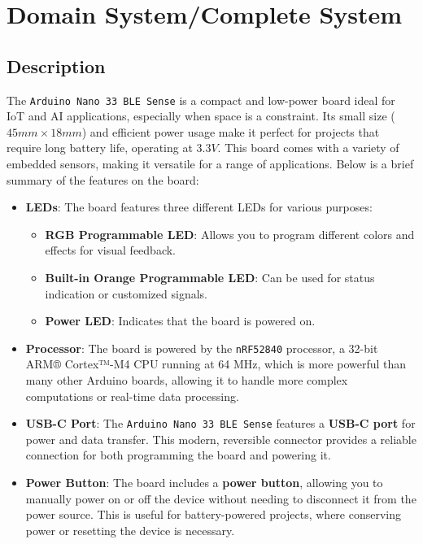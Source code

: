 %
%

\chapter{Domain System/Complete System}
\section{Description}
	The \texttt{Arduino Nano 33 BLE Sense} is a compact and low-power board ideal for IoT and AI applications, especially when space is a constraint. Its small size (\(45mm \times 18mm\)) and efficient power usage make it perfect for projects that require long battery life, operating at \(3.3V\). This board comes with a variety of embedded sensors, making it versatile for a range of applications.\cite{Gyroplace:2023} Below is a brief summary of the features on the board:
	
	\begin{itemize}
		\item \textbf{LEDs}: The board features three different LEDs for various purposes:
		\begin{itemize}
			\item \textbf{RGB Programmable LED}: Allows you to program different colors and effects for visual feedback.
			\item \textbf{Built-in Orange Programmable LED}: Can be used for status indication or customized signals.
			\item \textbf{Power LED}: Indicates that the board is powered on.
		\end{itemize}
		\item \textbf{Processor}: The board is powered by the \texttt{nRF52840} processor, a 32-bit ARM® Cortex™-M4 CPU running at 64 MHz, which is more powerful than many other Arduino boards, allowing it to handle more complex computations or real-time data processing.
		
		\item \textbf{USB-C Port}: The \texttt{Arduino Nano 33 BLE Sense} features a \textbf{USB-C port} for power and data transfer. This modern, reversible connector provides a reliable connection for both programming the board and powering it.
		
		\item \textbf{Power Button}: The board includes a \textbf{power button}, allowing you to manually power on or off the device without needing to disconnect it from the power source. This is useful for battery-powered projects, where conserving power or resetting the device is necessary.
	\end{itemize}
	
